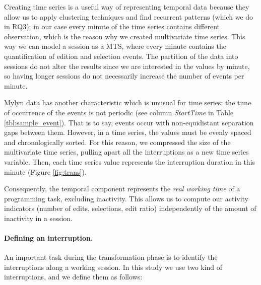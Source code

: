 \documentclass[times]{smrauth}
\newcommand\RR[1]{\textbf{Romain #1}}
\begin{document}
Creating time series is a useful way of representing temporal data because they allow us to apply clustering techniques and find recurrent patterns (which we do in RQ3); in our case every minute of the time series contains different observation, which is the reason why we created multivariate time series. This way we can model a session as a MTS, where every minute contains the quantification of edition and selection events. The partition of the data into sessions do not alter the results since we are interested in the values by minute, so having longer sessions do not necessarily increase the number of events per minute.


Mylyn data has another characteristic which is unusual for time series: the time of occurrence of the events is not periodic (see column \textit{StartTime} in Table \ref{tbl:sample_event}). That is to say, events occur with non-equidistant separation gaps between them. However, in a time series, the values must be evenly spaced and chronologically sorted. For this reason, we compressed the size of the multivariate time series, pulling apart all the interruptions as a new time series variable. Then, each time series value represents the interruption duration in this minute (Figure \ref{fig:trans}). 


Consequently, the temporal component represents the \textit{real working time} of a programming task, excluding inactivity. This allows us to compute our activity indicators (number of edits, selections, edit ratio) independently of the amount of inactivity in a session.
\paragraph{Defining an interruption.} An important task during the transformation phase is to identify the interruptions along a working session. In this study we use two kind of interruptions, and we define them as follows:
\end{document}
